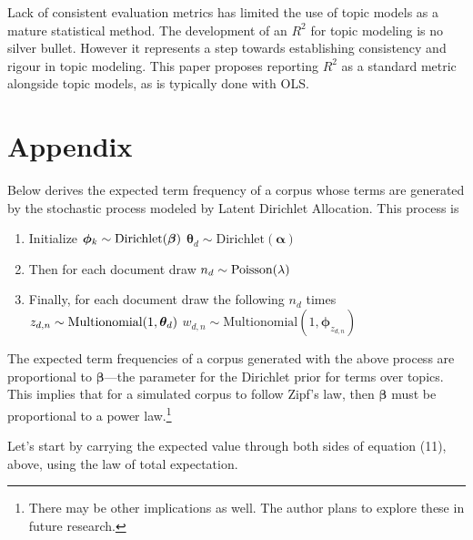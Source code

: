 \documentclass[conference,final,]{IEEEtran}
\providecommand{\tightlist}{%
  \setlength{\itemsep}{0pt}\setlength{\parskip}{0pt}}
\begin{document}
Lack of consistent evaluation metrics has limited the use of topic
models as a mature statistical method. The development of an \(R^2\) for
topic modeling is no silver bullet. However it represents a step towards
establishing consistency and rigour in topic modeling. This paper
proposes reporting \(R^2\) as a standard metric alongside topic models,
as is typically done with OLS.

\newpage

\hypertarget{appendix}{%
\section{Appendix}\label{appendix}}

Below derives the expected term frequency of a corpus whose terms are
generated by the stochastic process modeled by Latent Dirichlet
Allocation. This process is

\begin{enumerate}
\def\labelenumi{\arabic{enumi}.}
\tightlist
\item
  Initialize
  \(\\ \boldsymbol\phi_k \sim \text{Dirichlet}(\boldsymbol\beta)\\\)
  \(\boldsymbol\theta_d \sim \text{Dirichlet}(\boldsymbol\alpha)\)
\item
  Then for each document draw \(\\ n_d \sim \text{Poisson}(\lambda)\)
\item
  Finally, for each document draw the following \(n_d\) times
  \(\\ z_{d,n} \sim \text{Multionomial}(1, \boldsymbol\theta_d)\\\)
  \(w_{d,n} \sim \text{Multionomial}(1, \boldsymbol\phi_{z_{d,n}})\)
\end{enumerate}

The expected term frequencies of a corpus generated with the above
process are proportional to \(\boldsymbol\beta\)---the parameter for the
Dirichlet prior for terms over topics. This implies that for a simulated
corpus to follow Zipf's law, then \(\boldsymbol\beta\) must be
proportional to a power law.\footnote{There may be other implications as
  well. The author plans to explore these in future research.}

Let's start by carrying the expected value through both sides of
equation (11), above, using the law of total expectation.
\end{document}

